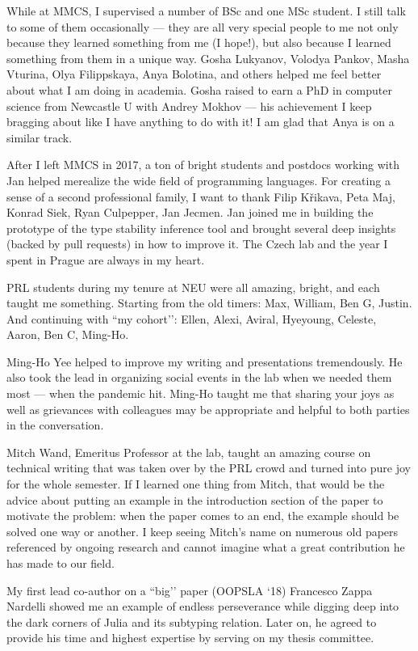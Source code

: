 While at MMCS, I supervised a number of BSc and one MSc student. I still talk to some of them occasionally — they are all very special people to me not only because they learned something from me (I hope!), but also because I learned something from them in a unique way. Gosha Lukyanov, Volodya Pankov, Masha Vturina, Olya Filippskaya, Anya Bolotina, and others helped me feel better about what I am doing in academia. Gosha raised to earn a PhD in computer science from Newcastle U with Andrey Mokhov — his achievement I keep bragging about like I have anything to do with it! I am glad that Anya is on a similar track.

After I left MMCS in 2017, a ton of bright students and postdocs working with
Jan helped merealize the wide field of programming languages. For creating a
sense of a second professional family, I want to thank Filip Křikava, Peta Maj,
Konrad Siek, Ryan Culpepper, Jan Jecmen. Jan joined me in building the prototype
of the type stability inference tool and brought several deep insights (backed
by pull requests) in how to improve it. The Czech lab and the year I spent in
Prague are always in my heart.

PRL students during my tenure at NEU were all amazing, bright, and each taught me something. Starting from the old timers: Max, William, Ben G, Justin. And continuing with ``my cohort’’: Ellen, Alexi, Aviral, Hyeyoung, Celeste, Aaron, Ben C, Ming-Ho.

Ming-Ho Yee helped to improve my writing and presentations tremendously. He also took the lead in organizing social events in the lab when we needed them most — when the pandemic hit. Ming-Ho taught me that sharing your joys as well as grievances with colleagues may be appropriate and helpful to both parties in the conversation.

Mitch Wand, Emeritus Professor at the lab, taught an amazing course on technical
writing that was taken over by the PRL crowd and turned into pure joy for the
whole semester. If I learned one thing from Mitch, that would be the advice
about putting an example in the introduction section of the paper to motivate
the problem: when the paper comes to an end, the example should be solved one
way or another. I keep seeing Mitch’s name on numerous old papers referenced by ongoing research and cannot imagine what a great contribution he has made to our field.

My first lead co-author on a ``big’’ paper (OOPSLA ‘18) Francesco Zappa Nardelli showed me an example of endless perseverance while digging deep into the dark corners of Julia and its subtyping relation. Later on, he agreed to provide his time and highest expertise by serving on my thesis committee.

